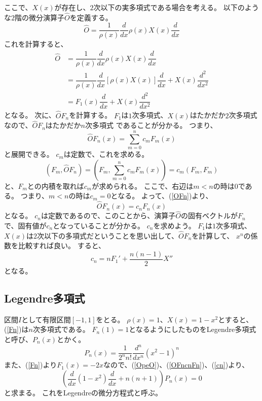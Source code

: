 ここで、$X(x)$が存在し、$2$次以下の実多項式である場合を考える。
以下のような$2$階の微分演算子$\hat{O}$を定義する。
\begin{equation}
  \label{OpeO}
  \hat{O} = \dfrac{1}{\rho(x)}\dfrac{d}{dx}\rho(x)X(x)\dfrac{d}{dx}
\end{equation}
これを計算すると、
\begin{align}
  \hat{O} &= \dfrac{1}{\rho(x)}\dfrac{d}{dx}\rho(x)X(x)\dfrac{d}{dx} \\
  &= \dfrac{1}{\rho(x)} \dfrac{d}{dx}\left[\rho(x)X(x) \right]\dfrac{d}{dx}
  + X(x)\dfrac{d^2}{dx^2} \\
  &= F_1(x)\dfrac{d}{dx} + X(x)\dfrac{d^2}{dx^2}
\end{align}
となる。
次に、$\hat{O}F_n$を計算する。
$F_1$は$1$次多項式、$X(x)$はたかだか$2$次多項式なので、$\hat{O}F_n$はたかだか$n$次多項式
であることが分かる。
つまり、
\begin{equation}
  \label{OFn}
  \hat{O}F_n(x) = \sum_{m=0}^n c_m F_m(x)
\end{equation}
と展開できる。
$c_m$は定数で、これを求める。
\begin{equation}
  (F_m, \hat{O}F_n) = (F_m,\sum_{m=0}^n c_m F_m(x)) = c_m(F_m,F_m)
\end{equation}
と、$F_m$との内積を取れば$c_m$が求められる。
ここで、右辺は$m < n$の時は$0$である。
つまり、$m < n$の時は$c_m = 0$となる。
よって、(\ref{OFn})より、
\begin{equation}
  \label{OFncnFn}
  \hat{O}F_n(x) = c_n F_n(x)
\end{equation}
となる。
$c_n$は定数であるので、このことから、演算子$\hat{O}$の固有ベクトルが$F_n$で、固有値が$c_n$となっていることが分かる。
$c_n$を求めよう。
$F_1$は$1$次多項式、$X(x)$は$2$次以下の多項式だということを思い出して、$\hat{O}F_n$を計算して、
$x^n$の係数を比較すれば良い。
すると、
\begin{equation}
  \label{cn}
  c_n = nF_1' + \dfrac{n(n-1)}{2}X''
\end{equation}
となる。

\subsection{Legendre多項式}
区間$I$として有限区間$[-1,1]$をとる。
$\rho(x) = 1$、$X(x) = 1 - x^2$とすると、(\ref{Fn})は$n$次多項式である。
$F_n(1) = 1$となるようにしたものをLegendre多項式と呼び、$P_n(x)$とかく。
\begin{equation}
  \label{legendre_polynomials}
  P_n(x) = \dfrac{1}{2^n n!}\dfrac{d^n}{dx^n}(x^2 - 1)^n
\end{equation}
また、(\ref{Fn})より$F_1(x) = -2x$なので、(\ref{OpeO})、(\ref{OFncnFn})、(\ref{cn})より、
\begin{equation}
  \label{legendre_DE}
  \left( \dfrac{d}{dx}(1-x^2)\dfrac{d}{dx} + n(n+1)\right)P_n(x) = 0
\end{equation}
と求まる。
これをLegendreの微分方程式と呼ぶ。

